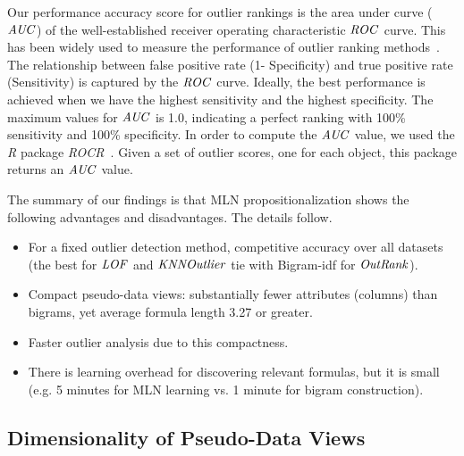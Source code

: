 	
	Our performance accuracy score for outlier rankings is the area under curve ($\it{AUC}$) of the well-established receiver operating characteristic $\it{ROC}$ curve. 
	This has been widely used to measure the performance of outlier ranking methods~\cite{Muller2012}. The relationship between false positive rate (1- Specificity) and true positive rate (Sensitivity) is captured by the $\it{ROC}$ curve. Ideally, the best performance is achieved when we have the highest sensitivity and the highest specificity. 
	The maximum values for $\it{AUC}$ is 1.0, indicating a perfect ranking with 100\% sensitivity and 100\% specificity. In order to compute the $\it{AUC}$ value, we used the \textit{R} package \textit{ROCR}~\cite{RROCR2012}. Given a set of outlier scores, one for each object, this package returns an $\it{AUC}$ value. 
	
	
	The summary of our findings is that MLN propositionalization shows the following advantages and disadvantages. The details follow.
	
	\begin{itemize}
		\item For a fixed outlier detection method, competitive accuracy over all datasets (the best for $\it{LOF}$ and $\it{KNNOutlier}$ tie with Bigram-idf for $\it{OutRank}$). 
		\item Compact pseudo-\iid data views: substantially fewer attributes (columns) than bigrams, yet average formula length 3.27 or greater.
		\item Faster outlier analysis due to this compactness.
		\item There is learning overhead for discovering relevant formulas, but it is small (e.g. 5 minutes for MLN learning vs. 1 minute for bigram construction).
	\end{itemize}
	
	
	\subsection{Dimensionality of Pseudo-\iid Data Views}
	
